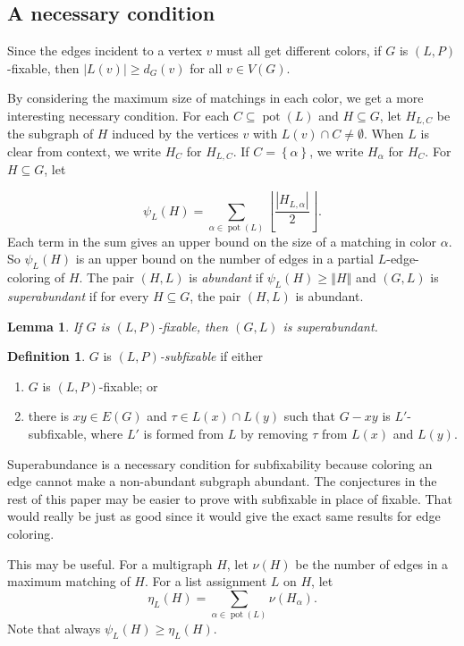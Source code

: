 \documentclass[12pt]{article}
\theoremstyle{plain}
\newtheorem{lem}[thm]{Lemma}
\theoremstyle{definition}
\newtheorem{defn}{Definition}
\theoremstyle{remark}
\newcommand{\set}[1]{\left\{ #1 \right\}}
\newcommand{\card}[1]{\left|#1\right|}
\newcommand{\size}[1]{\left\Vert#1\right\Vert}
\newcommand{\floor}[1]{\left\lfloor#1\right\rfloor}
\newcommand{\pot}{\operatorname{pot}}
\begin{document}
\subsection{A necessary condition}
Since the edges incident to a vertex $v$ must all get different colors, 
if $G$ is $(L, P)$-fixable, then $|L(v)| \ge d_G(v)$ for all $v \in V(G)$.

By considering the maximum size of matchings in each color, we get a more
interesting necessary condition.
For each $C \subseteq \pot(L)$ and $H \subseteq G$, let $H_{L, C}$ be the
subgraph of $H$ induced by the vertices $v$ with $L(v) \cap C \ne \emptyset$. 
When $L$ is clear from context, we write $H_C$ for $H_{L,C}$. If $C =
\set{\alpha}$, we write $H_\alpha$ for $H_C$.  For $H \subseteq G$, let

\[\psi_L(H) = \sum_{\alpha \in \pot(L)} \floor{\frac{\card{H_{L, \alpha}}}{2}}.\]
Each term in the sum gives an upper bound on the size of a matching in color
$\alpha$. So $\psi_L(H)$ is an upper bound on the number of edges in a
partial $L$-edge-coloring of $H$.  The pair $(H, L)$ is \emph{abundant} if
$\psi_L(H) \ge \size{H}$ and $(G,L)$ is \emph{superabundant} if for every
$H \subseteq G$, the pair $(H, L)$ is abundant.  

\begin{lem}
\label{SuperabundanceIsNecessary} 
If $G$ is $(L, P)$-fixable, then $(G, L)$ is superabundant.  
\end{lem}


\begin{defn}
$G$ is \emph{$(L, P)$-subfixable} if either
\begin{enumerate}
\item[(1)] $G$ is $(L, P)$-fixable; or
\item[(2)] there is $xy \in E(G)$ and $\tau \in L(x) \cap L(y)$ such that
$G-xy$ is $L'$-subfixable, where $L'$ is formed from $L$ by removing $\tau$ from
$L(x)$ and $L(y)$.
\end{enumerate}
\end{defn}

Superabundance is a necessary condition for subfixability because coloring an
edge cannot make a non-abundant subgraph abundant.  The conjectures in the rest
of this paper may be easier to prove with subfixable in place of fixable.  That would
really be just as good since it would give the exact same results for edge coloring.

This may be useful.  For a multigraph $H$, let $\nu(H)$ be the number of edges in a maximum matching
of $H$.  For a list assignment $L$ on $H$, let 
$$\eta_L(H) = \sum_{\alpha \in \pot(L)} \nu(H_\alpha).$$  
Note that always $\psi_L(H) \ge \eta_L(H)$.
\end{document}
